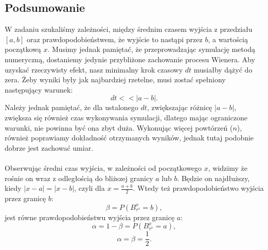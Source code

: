 \documentclass{article}
\theoremstyle{break}
\begin{document}
\subsection*{Podsumowanie}
W zadaniu szukaliśmy zależności, między średnim czasem wyjścia z przedziału $[a,b]$ oraz prawdopodobieństwem, że wyjście to nastąpi przez $b$, a wartością początkową $x$. Musimy jednak pamiętać, że przeprowadzając symulację metodą numeryczną, dostaniemy jedynie przybliżone zachowanie procesu Wienera. Aby uzyskać rzeczywisty efekt, nasz minimalny krok czasowy $dt$ musiałby dążyć do zera. Żeby wyniki były jak najbardziej rzetelne, musi zostać spełniony następujący warunek:
 $$dt<<|a-b|.$$ 
Należy jednak pamiętać, że dla ustalonego $dt$, zwiększając różnicę $|a-b|$, zwiększa się również czas wykonywania symulacji, dlatego mając ograniczone warunki, nie powinna być ona zbyt duża. Wykonując więcej powtórzeń ($n$), również poprawiamy dokładność otrzymanych wyników, jednak tutaj podobnie dobrze jest zachować umiar.
\\ \\
Obserwując średni czas wyjścia, w zależności od początkowego $x$, widzimy że rośnie on wraz z odległością do bliższej granicy $a$ lub $b$. Będzie on najdłuższy, kiedy $|x-a|=|x-b|$, czyli dla $x=\frac{a+b}{2}$. Wtedy też prawdopodobieństwo wyjścia przez granicę $b$:
 $$\beta=P(B_{\tau^x}^x=b),$$
jest równe prawdopodobieństwu wyjścia przez granicę $a$: $$\alpha=1-\beta=P(B_{\tau^x}^x=a),$$
$$\alpha=\beta=\frac{1}{2}.$$
\end{document}
